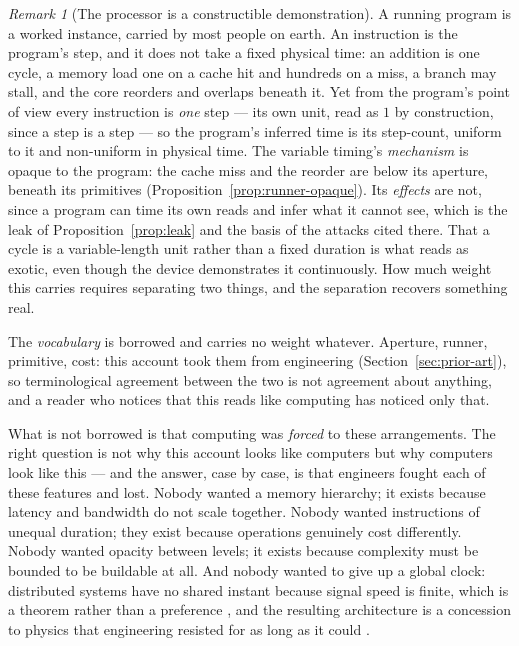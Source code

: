 \documentclass[11pt,a4paper]{article}
\theoremstyle{remark}\newtheorem{remark}[definition]{Remark}
\begin{document}
\begin{remark}[The processor is a constructible demonstration]\label{rem:processor}
A running program is a worked instance, carried by most people on earth. An instruction is the program's step, and it does not take a fixed physical time: an addition is one cycle, a memory load one on a cache hit and hundreds on a miss, a branch may stall, and the core reorders and overlaps beneath it. Yet from the program's point of view every instruction is \emph{one} step --- its own unit, read as $1$ by construction, since a step is a step --- so the program's inferred time is its step-count, uniform to it and non-uniform in physical time. The variable timing's \emph{mechanism} is opaque to the program: the cache miss and the reorder are below its aperture, beneath its primitives (Proposition~\ref{prop:runner-opaque}). Its \emph{effects} are not, since a program can time its own reads and infer what it cannot see, which is the leak of Proposition~\ref{prop:leak} and the basis of the attacks cited there. That a cycle is a variable-length unit rather than a fixed duration is what reads as exotic, even though the device demonstrates it continuously. How much weight this carries requires separating two things, and the separation recovers something real.

The \emph{vocabulary} is borrowed and carries no weight whatever. Aperture, runner, primitive, cost: this account took them from engineering (Section~\ref{sec:prior-art}), so terminological agreement between the two is not agreement about anything, and a reader who notices that this reads like computing has noticed only that.

What is not borrowed is that computing was \emph{forced} to these arrangements. The right question is not why this account looks like computers but why computers look like this --- and the answer, case by case, is that engineers fought each of these features and lost. Nobody wanted a memory hierarchy; it exists because latency and bandwidth do not scale together. Nobody wanted instructions of unequal duration; they exist because operations genuinely cost differently. Nobody wanted opacity between levels; it exists because complexity must be bounded to be buildable at all. And nobody wanted to give up a global clock: distributed systems have no shared instant because signal speed is finite, which is a theorem rather than a preference \citep{lamport1978}, and the resulting architecture is a concession to physics that engineering resisted for as long as it could \citep{chapiro1984,brewer2000}.


\end{remark}
\end{document}
